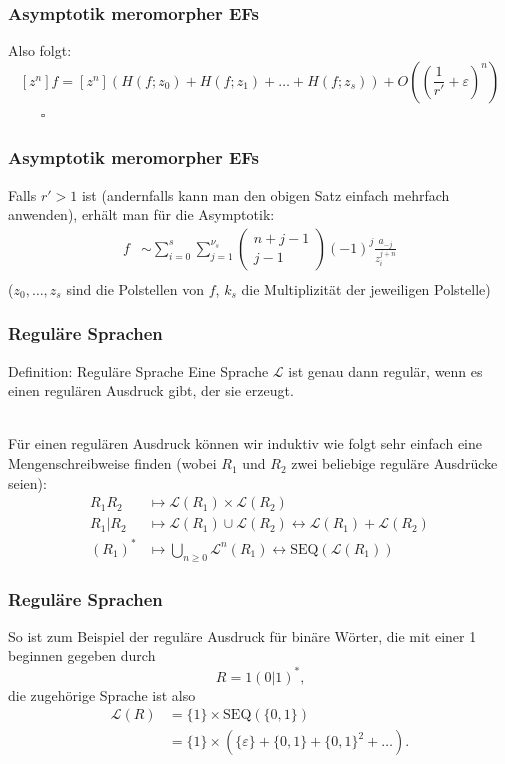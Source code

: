 \documentclass{beamer}
\begin{document}
\begin{frame}\frametitle{Asymptotik meromorpher EFs}
  Also folgt:
  \[
    [z^n] f = [z^n] (H(f; z_0) + H(f; z_1) + \dots + H(f; z_s)) + O \left( \left(\frac{1}{r'} + \varepsilon \right)^n \right)
  \]
  $\qquad$
  \hfill
  $\square$
\end{frame}

\begin{frame}\frametitle{Asymptotik meromorpher EFs}
  Falls $r' > 1$ ist (andernfalls kann man den obigen Satz einfach mehrfach anwenden), erhält man für die Asymptotik:
  \begin{align*}
    [z^n] f &\sim \sum\limits_{i = 0}^s \sum\limits_{j = 1}^{\nu_s} \begin{pmatrix} n + j - 1 \\ j - 1 \end{pmatrix} (-1)^j \frac{a_{-j}}{z_i^{j + n}} \\
  \end{align*}
  ($z_0, \dots, z_s$ sind die Polstellen von $f$, $k_s$ die Multiplizität der jeweiligen Polstelle)
\end{frame}

\begin{frame}\frametitle{Reguläre Sprachen}
  \begin{block}{Definition: Reguläre Sprache}
  	Eine Sprache  $\mathcal{L}$ ist genau dann regulär, wenn es einen regulären Ausdruck gibt, der sie erzeugt.
  \end{block}
  \qquad \\
  Für einen regulären Ausdruck können wir induktiv wie folgt sehr einfach eine Mengenschreibweise finden (wobei $R_1$ und $R_2$ zwei beliebige reguläre Ausdrücke seien):
  \begin{align*}
    R_1 R_2 &\mapsto \mathcal{L}(R_1) \times \mathcal{L}(R_2) \\
    R_1 | R_2 &\mapsto \mathcal{L}(R_1) \cup \mathcal{L}(R_2) \leftrightarrow \mathcal{L}(R_1) + \mathcal{L}(R_2) \\
    (R_1)^* &\mapsto \bigcup\limits_{n \geq 0} \mathcal{L}^n(R_1) \leftrightarrow \text{SEQ}(\mathcal{L}(R_1))
  \end{align*}
\end{frame}

\begin{frame}\frametitle{Reguläre Sprachen}
  So ist zum Beispiel der reguläre Ausdruck für binäre Wörter, die mit einer 1 beginnen gegeben durch
  \[
    R = 1 (0|1)^* \text{,}
  \]
  die zugehörige Sprache ist also
  \begin{align*}
    \mathcal{L}(R) &= \{ 1 \} \times \text{SEQ}(\{ 0, 1 \}) \\
                   &= \{ 1 \} \times (\{ \varepsilon \} + \{ 0, 1 \} + \{ 0, 1 \}^2 + \dots) \text{.}
  \end{align*}
\end{frame}
\end{document}
